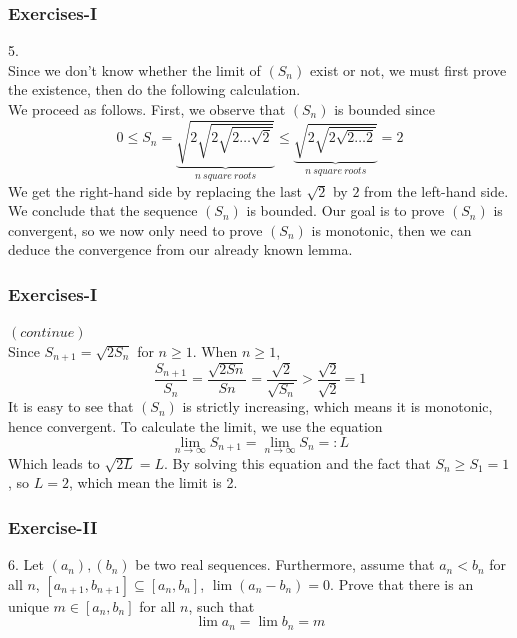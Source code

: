 \documentclass[12pt, t]{beamer}
\begin{document}
\begin{frame}
    \frametitle{Exercises-I}
    5.\\
    \hspace{1em} Since we don't know whether the limit of $(S_n)$ exist or not, we must first prove the existence, then do the following
    calculation.\\
    \hspace{1em} We proceed as follows. First, we observe that $(S_n)$ is bounded since
    \begin{equation*}
        0\leq S_n=\underbrace{\sqrt{2\sqrt{2\sqrt{2\dots\sqrt{2}}}}}_{n\ square\ roots} \leq \underbrace{\sqrt{2\sqrt{2\sqrt{2\dots 2}}}}_{n\ square\ roots}=2
    \end{equation*}
    We get the right-hand side by replacing the last $\sqrt{2}$ by $2$
    from the left-hand side.\\
    \hspace{1em} We conclude that the sequence $(S_n)$ is bounded. Our goal is to prove $(S_n)$ is convergent, so we now only need to prove
    $(S_n)$ is monotonic, then we can deduce the convergence from our already known lemma.
\end{frame}

\begin{frame}
    \frametitle{Exercises-I}
    $(continue)$\\
    \hspace{1em} Since $S_{n+1}=\sqrt{2S_n}$ for $n\geq 1$. When $n\geq 1$,
    \begin{equation*}
        \frac{S_{n+1}}{S_n}=\frac{\sqrt{2Sn}}{Sn}=\frac{\sqrt{2}}{\sqrt{S_n}}>\frac{\sqrt{2}}{\sqrt{2}}=1
    \end{equation*}
    \hspace{1em} It is easy to see that $(S_n)$ is strictly increasing, which means it is monotonic,
    hence convergent.
    \hspace{1em} To calculate the limit, we use the equation
    \begin{equation*}
        \lim_{n\rightarrow\infty} S_{n+1}=\lim_{n\rightarrow\infty} S_n =: L
    \end{equation*}
    \hspace{1em} Which leads to $\sqrt{2L}=L$. By solving this equation and the fact that $S_n\geq S_1=1$, so $L=2$, which mean the limit is 2.

\end{frame}


\begin{frame}
    \frametitle{Exercise-II}
    6. Let $(a_n),(b_n)$ be two real sequences. Furthermore, assume that $a_n<b_n$
    for all $n$, $[a_{n+1}, b_{n+1}]\subseteq [a_n,b_n]$, $\lim (a_n-b_n)=0$. Prove that there
    is an unique $m\in [a_n,b_n]$ for all $n$, such that
    \begin{equation*}
        \lim a_n=\lim b_n=m
    \end{equation*}
\end{frame}
\end{document}
